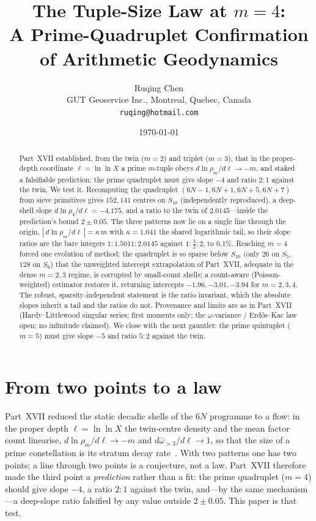\documentclass[11pt]{article}
\title{The Tuple-Size Law at $m=4$:\\
A Prime-Quadruplet Confirmation of Arithmetic Geodynamics}
\author{Ruqing Chen\\
\small GUT Geoservice Inc., Montreal, Quebec, Canada\\
\small \texttt{ruqing@hotmail.com}}
\date{\today}
\begin{document}
\maketitle

\begin{abstract}
Part~XVII established, from the twin ($m=2$) and triplet ($m=3$), that in the
proper-depth coordinate $\ell=\ln\ln X$ a prime $m$-tuple obeys
$d\ln\rho_m/d\ell\to-m$, and staked a falsifiable prediction: the prime
quadruplet must give slope $-4$ and ratio $2{:}1$ against the twin. We test it.
Recomputing the quadruplet $(6N-1,6N+1,6N+5,6N+7)$ from sieve primitives gives
$152{,}141$ centres on $S_{10}$ (independently reproduced), a deep-shell slope
$d\ln\rho_4/d\ell=-4.175$, and a ratio to the twin of $2.0145$---inside the
prediction's bound $2\pm0.05$. The three patterns now lie on a single line through
the origin, $|\,d\ln\rho_m/d\ell\,|=\kappa\,m$ with $\kappa=1.041$ the shared
logarithmic tail, so their slope ratios are the bare integers
$1:1.5011:2.0145$ against $1:\tfrac32:2$, to $0.1\%$. Reaching $m=4$ forced one
evolution of method: the quadruplet is so sparse below $S_{10}$ (only $26$ on
$S_5$, $128$ on $S_6$) that the unweighted intercept extrapolation of Part~XVII,
adequate in the dense $m=2,3$ regime, is corrupted by small-count shells; a
count-aware (Poisson-weighted) estimator restores it, returning intercepts
$-1.96,-3.01,-3.94$ for $m=2,3,4$. The robust, sparsity-independent statement is
the ratio invariant, which the absolute slopes inherit a tail and the ratios do
not. Provenance and limits are as in Part~XVII (Hardy--Littlewood singular series;
first moments only; the $\omega$-variance / Erd\H{o}s--Kac law open; no infinitude
claimed). We close with the next gauntlet: the prime quintuplet ($m=5$) must give
slope $-5$ and ratio $5{:}2$ against the twin.
\end{abstract}

\section{From two points to a law}

Part~XVII reduced the static decadic shells of the $6N$ programme to a flow: in
the proper depth $\ell=\ln\ln X$ the twin-centre density and the mean factor count
linearise, $d\ln\rho_m/d\ell\to-m$ and $d\bar\omega_{>3}/d\ell\to1$, so that the
size of a prime constellation is its stratum decay rate~\cite{ChenXVII}. With two
patterns one has two points; a line through two points is a conjecture, not a law.
Part~XVII therefore made the third point a \emph{prediction} rather than a fit:
the prime quadruplet ($m=4$) should give slope $-4$, a ratio $2{:}1$ against the
twin, and---by the same mechanism---a deep-slope ratio falsified by any value
outside $2\pm0.05$. This paper is that test.
\end{document}
